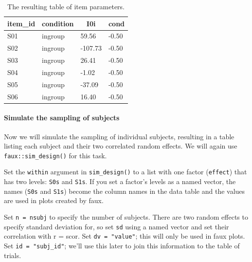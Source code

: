 \documentclass[man,floatsintext]{apa6}
\let\oldparagraph\paragraph
\renewcommand{\paragraph}[1]{\oldparagraph{#1}\mbox{}}
\begin{document}
\begin{table}[tbp]
\begin{center}
\begin{threeparttable}
\caption{\label{tab:items-table}The resulting table of item parameters.}
\begin{tabular}{llll}
\toprule
item\_id & \multicolumn{1}{c}{condition} & \multicolumn{1}{c}{I0i} & \multicolumn{1}{c}{cond}\\
\midrule
S01 & ingroup & 59.56 & -0.50\\
S02 & ingroup & -107.73 & -0.50\\
S03 & ingroup & 26.41 & -0.50\\
S04 & ingroup & -1.02 & -0.50\\
S05 & ingroup & -37.09 & -0.50\\
S06 & ingroup & 16.40 & -0.50\\
\bottomrule
\end{tabular}
\end{threeparttable}
\end{center}
\end{table}

\paragraph{Simulate the sampling of
subjects}\label{simulate-the-sampling-of-subjects}

Now we will simulate the sampling of individual subjects, resulting in a
table listing each subject and their two correlated random effects. We
will again use \texttt{faux::sim\_design()} for this task.

Set the \texttt{within} argument in \texttt{sim\_design()} to a list
with one factor (\texttt{effect}) that has two levels: \texttt{S0s} and
\texttt{S1s}. If you set a factor's levels as a named vector, the names
(\texttt{S0s} and \texttt{S1s}) become the column names in the data
table and the values are used in plots created by faux.

Set \texttt{n\ =\ nsubj} to specify the number of subjects. There are
two random effects to specify standard deviation for, so set \texttt{sd}
using a named vector and set their correlation with r = scor. Set
\texttt{dv\ =\ "value"}; this will only be used in faux plots. Set
\texttt{id\ =\ "subj\_id"}; we'll use this later to join this
information to the table of trials.
\end{document}
